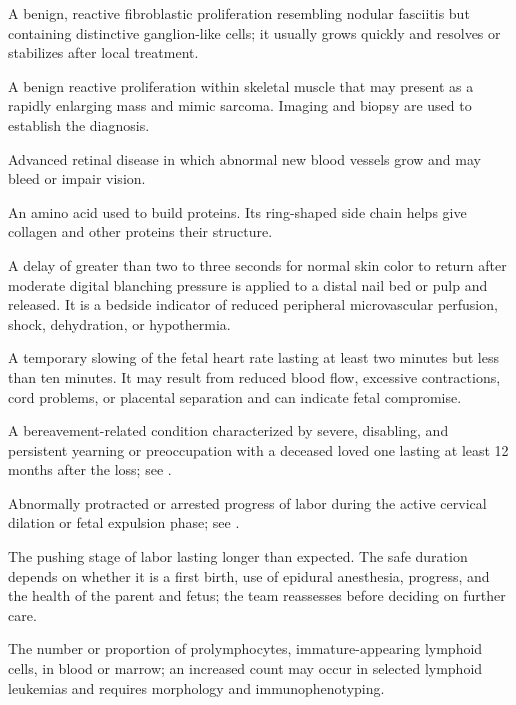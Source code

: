  A benign, reactive fibroblastic proliferation resembling nodular fasciitis but containing distinctive ganglion-like cells; it usually grows quickly and resolves or stabilizes after local treatment.

 A benign reactive proliferation within skeletal muscle that may present as a rapidly enlarging mass and mimic sarcoma. Imaging and biopsy are used to establish the diagnosis.

 Advanced retinal disease in which abnormal new blood vessels grow and may bleed or impair vision.

 An amino acid used to build proteins. Its ring-shaped side chain helps give collagen and other proteins their structure.

 A delay of greater than two to three seconds for normal skin color to return after moderate digital blanching pressure is applied to a distal nail bed or pulp and released. It is a bedside indicator of reduced peripheral microvascular perfusion, shock, dehydration, or hypothermia.

 A temporary slowing of the fetal heart rate lasting at least two minutes but less than ten minutes. It may result from reduced blood flow, excessive contractions, cord problems, or placental separation and can indicate fetal compromise.

 A bereavement-related condition characterized by severe, disabling, and persistent yearning or preoccupation with a deceased loved one lasting at least 12 months after the loss; see .

 Abnormally protracted or arrested progress of labor during the active cervical dilation or fetal expulsion phase; see .

 The pushing stage of labor lasting longer than expected. The safe duration depends on whether it is a first birth, use of epidural anesthesia, progress, and the health of the parent and fetus; the team reassesses before deciding on further care.

 The number or proportion of prolymphocytes, immature-appearing lymphoid cells, in blood or marrow; an increased count may occur in selected lymphoid leukemias and requires morphology and immunophenotyping.

